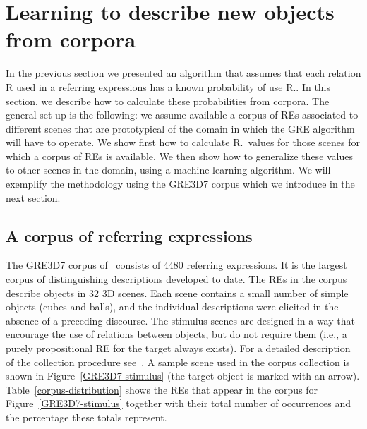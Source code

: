 \section{Learning to describe new objects from corpora}\label{sec:learning}

In the previous section we presented an algorithm that assumes that each relation R used in a referring expressions has a known probability of use R.\puse. In this section, we describe how to calculate these probabilities from corpora.  The general set up is the following: we assume available a corpus of REs associated to different scenes that are prototypical of the domain in which the GRE algorithm will have to operate.   We show first how to calculate R.\puse\ values for those scenes for which a corpus of REs is available.  We then show how to generalize these values to 
other scenes in the domain, using a machine learning algorithm.   We will exemplify the methodology using the GRE3D7 corpus which we introduce in the next section. 

\subsection{A corpus of referring expressions}

The GRE3D7 corpus of~ consists of 4480 referring expressions. It is the largest corpus of distinguishing descriptions developed to date. The REs in the corpus describe objects in 32 3D scenes. Each scene contains a small number of simple objects (cubes and balls), and the individual descriptions were elicited in the absence of a preceding discourse. The stimulus scenes are designed in a way that encourage the use of relations between objects, but do not require them (i.e., a purely propositional RE for the target always exists). For a detailed description of the collection procedure see~\cite[Chapter 5]{viet:gene11}. A sample scene used in the corpus collection is shown in Figure~\ref{GRE3D7-stimulus} (the target object is marked with an arrow). Table~\ref{corpus-distribution} shows the REs that appear in the corpus for Figure~\ref{GRE3D7-stimulus} together with their total number of occurrences and the percentage these totals represent.  

